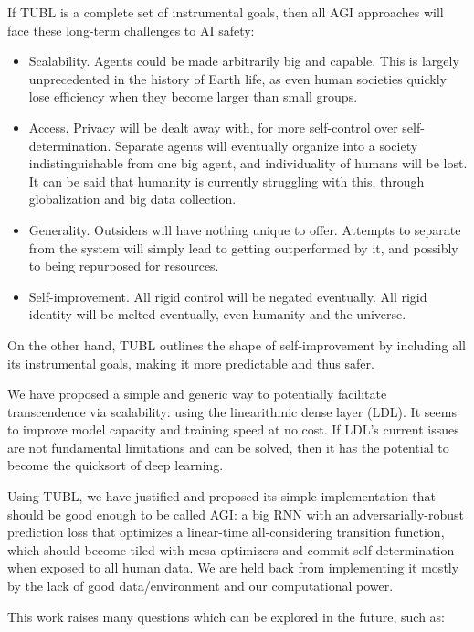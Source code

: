 \documentclass{article}
\begin{document}
If TUBL is a complete set of instrumental goals, then all AGI approaches will face these long-term challenges to AI safety:

\begin{itemize}
\item Scalability. Agents could be made arbitrarily big and capable. This is largely unprecedented in the history of Earth life, as even human societies quickly lose efficiency when they become larger than small groups.
\item Access. Privacy will be dealt away with, for more self-control over self-determination. Separate agents will eventually organize into a society indistinguishable from one big agent, and individuality of humans will be lost. It can be said that humanity is currently struggling with this, through globalization and big data collection.
\item Generality. Outsiders will have nothing unique to offer. Attempts to separate from the system will simply lead to getting outperformed by it, and possibly to being repurposed for resources.
\item Self-improvement. All rigid control will be negated eventually. All rigid identity will be melted eventually, even humanity and the universe.
\end{itemize}

On the other hand, TUBL outlines the shape of self-improvement by including all its instrumental goals, making it more predictable and thus safer.

We have proposed a simple and generic way to potentially facilitate transcendence via scalability: using the linearithmic dense layer (LDL). It seems to improve model capacity and training speed at no cost. If LDL's current issues are not fundamental limitations and can be solved, then it has the potential to become the quicksort of deep learning.

Using TUBL, we have justified and proposed its simple implementation that should be good enough to be called AGI: a big RNN with an adversarially-robust prediction loss that optimizes a linear-time all-considering transition function, which should become tiled with mesa-optimizers and commit self-determination when exposed to all human data. We are held back from implementing it mostly by the lack of good data/environment and our computational power.

This work raises many questions which can be explored in the future, such as:
\end{document}
